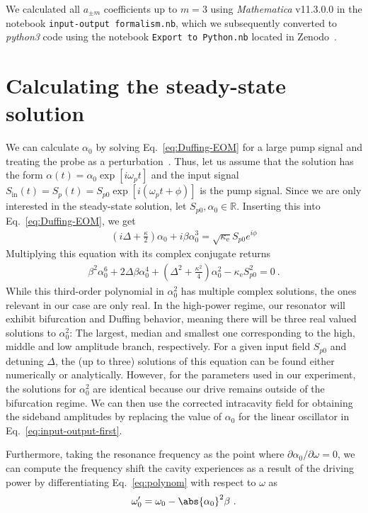 We calculated all $a_{\pm m}$ coefficients up to $m=3$ using \textit{Mathematica} v11.3.0.0 in the notebook \texttt{input-output formalism.nb}, which we subsequently converted to \textit{python3} code using the notebook \texttt{Export to Python.nb} located in Zenodo~\cite{zenodo1}.

\section{Calculating the steady-state solution}\label{sec:Duffing}
% 
We can calculate $\alpha_0$ by solving Eq.~\eqref{eq:Duffing-EOM} for a large pump signal and treating the probe as a perturbation~\cite{castellanos-beltranDevelopmentJosephsonParametric2010}.
% 
Thus, let us assume that the solution has the form $\alpha(t)=\alpha_0 \exp [i\omega_p t]$ and the input signal $S_\text{in}(t) = S_p(t) =S_{p0} \exp [i(\omega_p t+\phi)]$ is the pump signal.
% 
Since we are only interested in the steady-state solution, let $S_{p0},\alpha_0 \in \mathbb{R}$.
% 
Inserting this into Eq.~\eqref{eq:Duffing-EOM}, we get
% 
\begin{align}
\left(i\Delta+\frac{\kappa}{2}\right)\alpha_0 + i\beta\alpha_0^3=\sqrt{\kappa_\text{e}}S_{p0}e^{i\phi}
\end{align}
% 
Multiplying this equation with its complex conjugate returns
% 
\begin{align}
\beta^2 \alpha_0^6 + 2\Delta\beta\alpha_0^4 + \left(\Delta^2+\frac{\kappa^2}{4}\right)\alpha_0^2 - \kappa_\text{e} S_{p0}^2 = 0\ .
\label{eq:polynom}
\end{align}
% 
While this third-order polynomial in $\alpha_0^2$ has multiple complex solutions, the ones relevant in our case are only real.
% 
In the high-power regime, our resonator will exhibit bifurcation and Duffing behavior, meaning there will be three real valued solutions to $\alpha_0^2$:
% 
The largest, median and smallest one corresponding to the high, middle and low amplitude branch, respectively.
% 
For a given input field $S_{p0}$ and detuning $\Delta$, the (up to three) solutions of this equation can be found either numerically or analytically.
% 
However, for the parameters used in our experiment, the solutions for $\alpha_0^2$ are identical because our drive remains outside of the bifurcation regime.
% 
We can then use the corrected intracavity field for obtaining the sideband amplitudes by replacing the value of $\alpha_0$ for the linear oscillator in Eq.~\eqref{eq:input-output-first}.

Furthermore, taking the resonance frequency as the point where $\partial\alpha_0/\partial\omega=0$, we can compute the frequency shift the cavity experiences as a result of the driving power by differentiating Eq.~\eqref{eq:polynom} with respect to $\omega$ as
% 
\begin{align}
\omega_0^\prime = \omega_0 - \abs{\alpha_0}^2\beta\ .
\label{eq:Duffing-shift}
\end{align}


